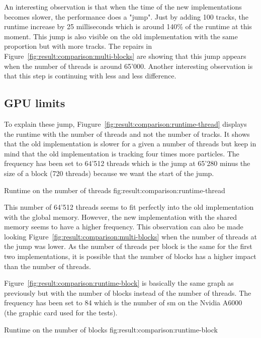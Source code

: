An interesting observation is that when the time of the new implementations
becomes slower, the performance does a "jump".
Just by adding 100 tracks, the runtime increase by 25 milliseconds which is
around 140\% of the runtime at this moment.
This jump is also visible on the old implementation with the same proportion but
with more tracks.
The repairs in Figure~\ref{fig:result:comparison:multi-blocks} are showing that
this jump appears when the number of threads is around 65'000.
Another interesting observation is that this step is continuing with less and
less difference.

\subsection{GPU limits}
\label{ch:result:comparison:gpu}

To explain these jump, Fiugure~\ref{fig:result:comparison:runtime-thread}
displays the runtime with the number of threads and not the number of tracks.
It shows that the old implementation is slower for a given a number of
threads but keep in mind that the old implementation is tracking four times
more particles.
The frequency has been set to 64'512 threads which is the jump at 65'280 minus
the size of a block (720 threads) because we want the start of the jump.

{Runtime on the number of threads}
{fig:result:comparison:runtime-thread}

This number of 64'512 threads seems to fit perfectly into the old implementation
with the global memory.
However, the new implementation with the shared memory seems to have a higher
frequency.
This observation can also be made looking Figure~\ref{fig:result:comparison:multi-blocks}
when the number of threads at the jump was lower.
As the number of threads per block is the same for the first two implementations,
it is possible that the number of blocks has a higher impact than the number of
threads.

Figure~\ref{fig:result:comparison:runtime-block} is basically the same graph as
previously but with the number of blocks instead of the number of threads.
The frequency has been set to 84 which is the number of \acrshort{sm} on the
Nvidia A6000~\cite{nvidia-a6000} (the graphic card used for the tests).

{Runtime on the number of blocks}
{fig:result:comparison:runtime-block}

